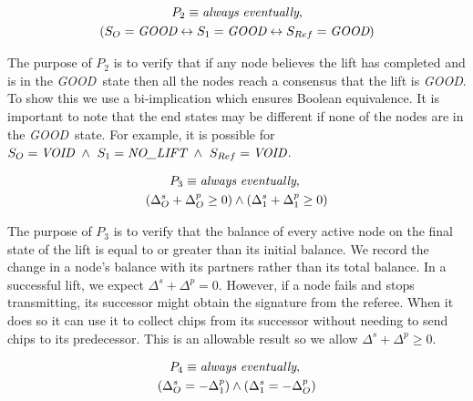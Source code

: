 \documentclass[runningheads]{llncs}
\newcommand{\originatorstate}{S_O}
\newcommand{\relayastate}{S_1}
\newcommand{\refstate}{S_{Ref}}
\newcommand{\originatorsuccbal}{\Delta^s_O}
\newcommand{\relayasuccbal}{\Delta^s_1}
\newcommand{\originatorpredbal}{\Delta^p_O}
\newcommand{\relayapredbal}{\Delta^p_1}
\newcommand{\nolift}{\emph{NO\_LIFT}}
\newcommand{\void}{\emph{VOID}}
\newcommand{\good}{\emph{GOOD}}
\newcommand{\always}{\emph{always}}
\newcommand{\eventually}{\emph{eventually}}
\newif\ifcomments
\newif\ifkylecomments
\newcommand{\egm}[1]{\ifcomments\textcolor{orange}{egm: #1}\fi}
\newcommand{\krs}[1]{\ifkylecomments\textcolor{blue}{krs: #1}\fi}
\begin{document}
\begin{definition}[Property 2]
    
\begin{multline*}
P_2 \equiv \always\ \eventually, \\
    (\originatorstate = \good \leftrightarrow \relayastate = \good \leftrightarrow \refstate = \good) \\
\end{multline*}
\end{definition}
The purpose of $P_2$ is to verify that if any node believes the lift has completed and is in the \good\ state then all the nodes reach a consensus that the lift is \good. To show this we use a bi-implication which ensures Boolean equivalence. It is important to note that the end states may be different if none of the nodes are in the \good\ state. For example, it is possible for $\originatorstate = \void\ \wedge\ \relayastate = \nolift\ \wedge\ \refstate = \void$.

\begin{definition}[Property 3]
\begin{multline*}
P_3 \equiv \always\ \eventually,\ \\
    (\originatorsuccbal + \originatorpredbal \ge 0) \wedge
    (\relayasuccbal + \relayapredbal \ge 0)\\
\end{multline*}
\end{definition}

The purpose of $P_3$ is to verify that the balance of every active node on the final state of the lift is equal to or greater than its initial balance. We record the change in a node's balance with its partners rather than its total balance. In a successful lift, we expect $\Delta^s + \Delta^p = 0$. However, if a node fails and stops transmitting, its successor might obtain the signature from the referee. When it does so it can use it to collect chips from its successor without needing to send chips to its predecessor. This is an allowable result so we allow $\Delta^s + \Delta^p \ge 0$.
\krs{should be 0, good catch \egm{On the previous inequality, should the `1` by a `0`?}}

\begin{definition}[Property 4]
\begin{multline*}
P_4 \equiv \always\ \eventually,\ \\
    (\originatorsuccbal = -\relayapredbal) \wedge
    (\relayasuccbal = -\originatorpredbal) \\
\end{multline*}
\end{definition}
\end{document}
